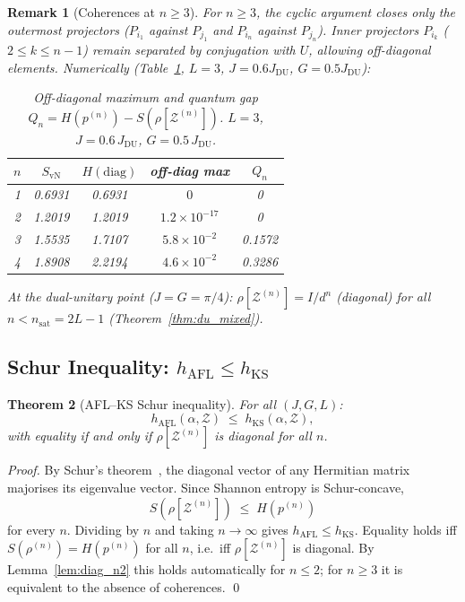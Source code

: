 \documentclass[12pt,a4paper]{article}
\newtheorem{theorem}{Theorem}[section]
\newtheorem{remark}[theorem]{Remark}
\begin{document}
\begin{remark}[Coherences at $n\geq 3$]
For $n\geq 3$, the cyclic argument closes only the outermost projectors ($P_{i_1}$
against $P_{j_1}$ and $P_{i_n}$ against $P_{j_n}$).  Inner projectors
$P_{i_k}$ ($2\leq k\leq n-1$) remain separated by conjugation with $U$,
allowing off-diagonal elements.  Numerically (Table~\ref{tab:diag_check},
$L=3$, $J=0.6J_{\mathrm{DU}}$, $G=0.5J_{\mathrm{DU}}$):

\begin{table}[h!]
\centering
\caption{Off-diagonal maximum and quantum gap $Q_n=H(p^{(n)})-S(\rho[\mathcal{Z}^{(n)}])$.
$L=3$, $J=0.6\,J_\mathrm{DU}$, $G=0.5\,J_\mathrm{DU}$.}
\label{tab:diag_check}
\begin{tabular}{c|c|c|c|c}
$n$ & $S_{\mathrm{vN}}$ & $H(\mathrm{diag})$ & off-diag max & $Q_n$\\
\hline
1 & 0.6931 & 0.6931 & $0$ & 0\\
2 & 1.2019 & 1.2019 & $1.2\times10^{-17}$ & 0\\
3 & 1.5535 & 1.7107 & $5.8\times10^{-2}$ & 0.1572\\
4 & 1.8908 & 2.2194 & $4.6\times10^{-2}$ & 0.3286\\
\end{tabular}
\end{table}

At the dual-unitary point ($J=G=\pi/4$): $\rho[\mathcal{Z}^{(n)}]=I/d^n$ (diagonal)
for all $n<n_{\mathrm{sat}}=2L-1$ (Theorem~\ref{thm:du_mixed}).
\end{remark}

\subsection{Schur Inequality: $h_{\mathrm{AFL}}\leq h_{\mathrm{KS}}$}
\label{sec:schur_ineq}

\begin{theorem}[AFL--KS Schur inequality]
\label{thm:schur}
For all $(J,G,L)$:
\[
  h_{\mathrm{AFL}}(\alpha,\mathcal{Z}) \;\leq\; h_{\mathrm{KS}}(\alpha,\mathcal{Z}),
\]
with equality if and only if $\rho[\mathcal{Z}^{(n)}]$ is diagonal for all $n$.
\end{theorem}

\begin{proof}
By Schur's theorem~\cite{bhatia}, the diagonal vector of any Hermitian matrix
majorises its eigenvalue vector.  Since Shannon entropy is Schur-concave,
\[
  S\!\left(\rho[\mathcal{Z}^{(n)}]\right)\;\leq\; H\!\left(p^{(n)}\right)
\]
for every $n$.  Dividing by $n$ and taking $n\to\infty$ gives
$h_{\mathrm{AFL}}\leq h_{\mathrm{KS}}$.
Equality holds iff $S(\rho^{(n)})=H(p^{(n)})$ for all $n$, i.e.\ iff
$\rho[\mathcal{Z}^{(n)}]$ is diagonal.  By Lemma~\ref{lem:diag_n2} this holds
automatically for $n\leq 2$; for $n\geq 3$ it is equivalent to the absence
of coherences.  \qed
\end{proof}
\end{document}
